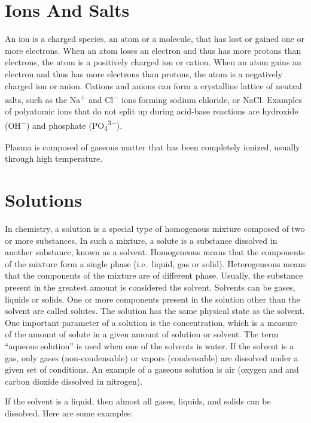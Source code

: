 \documentclass[
]{book}
\begin{document}
\hypertarget{ions-and-salts}{%
\section{Ions And Salts}\label{ions-and-salts}}

An ion is a charged species, an atom or a molecule, that has lost or gained one or more electrons. When an atom loses an electron and thus has more protons than electrons, the atom is a positively charged ion or cation. When an atom gains an electron and thus has more electrons than protons, the atom is a negatively charged ion or anion. Cations and anions can form a crystalline lattice of neutral salts, such as the Na\textsuperscript{+} and Cl\textsuperscript{−} ions forming sodium chloride, or NaCl. Examples of polyatomic ions that do not split up during acid-base reactions are hydroxide (OH\textsuperscript{−}) and phosphate (PO\textsubscript{4}\textsuperscript{3−}).

Plasma is composed of gaseous matter that has been completely ionized, usually through high temperature.

\hypertarget{solutions}{%
\section{Solutions}\label{solutions}}

In chemistry, a solution is a special type of homogenous mixture composed of two or more substances. In such a mixture, a solute is a substance dissolved in another substance, known as a solvent. Homogeneous means that the components of the mixture form a single phase (i.e.~liquid, gas or solid). Heterogeneous means that the components of the mixture are of different phase. Usually, the substance present in the greatest amount is considered the solvent. Solvents can be gases, liquids or solids. One or more components present in the solution other than the solvent are called solutes. The solution has the same physical state as the solvent. One important parameter of a solution is the concentration, which is a measure of the amount of solute in a given amount of solution or solvent. The term ``aqueous solution'' is used when one of the solvents is water. If the solvent is a gas, only gases (non-condensable) or vapors (condensable) are dissolved under a given set of conditions. An example of a gaseous solution is air (oxygen and and carbon dioxide dissolved in nitrogen).

If the solvent is a liquid, then almost all gases, liquids, and solids can be dissolved. Here are some examples:
\end{document}
